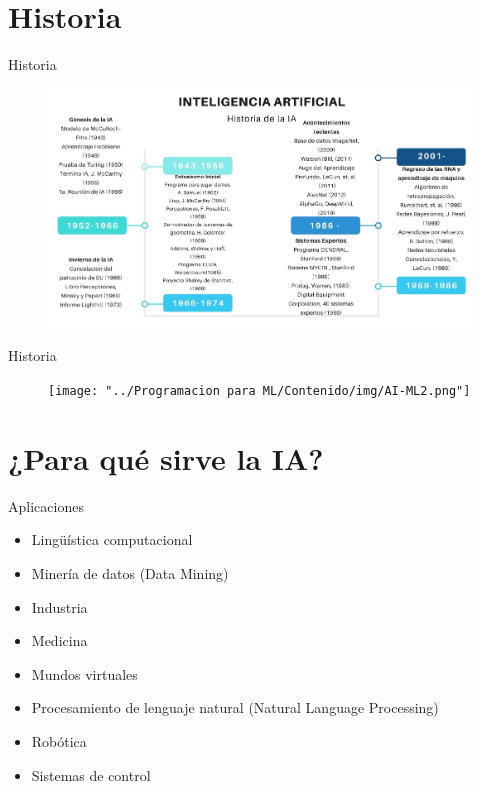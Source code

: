 \documentclass[11pt,aspectratio=169]{beamer}
\begin{document}
\section{Historia}
\begin{frame}{Historia}
    \begin{figure}
        \centering
        \includegraphics[scale=0.35]{img/historiaIA.png}
    \end{figure}
\end{frame}

\begin{frame}{Historia}
    \begin{figure}
        \centering
        \texttt{[image: "../Programacion para ML/Contenido/img/AI-ML2.png"]}
    \end{figure}
\end{frame}

\section{¿Para qué sirve la IA?}
\begin{frame}{Aplicaciones}
    \begin{itemize}
        \item Lingüística computacional\pause
        \item Minería de datos (Data Mining)\pause
        \item Industria\pause
        \item Medicina\pause
        \item Mundos virtuales\pause
        \item Procesamiento de lenguaje natural (Natural Language Processing)\pause
        \item Robótica\pause
        \item Sistemas de control
    \end{itemize}
\end{frame}
\end{document}
